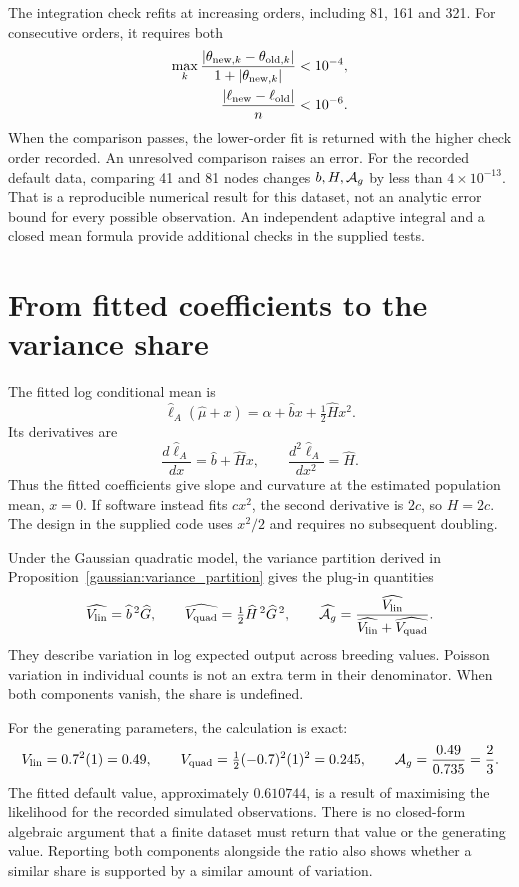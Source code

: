 The integration check refits at increasing orders, including 81, 161 and
321. For consecutive orders, it requires both
\begin{align}
 \max_k\frac{|\theta_{{\rm new},k}-\theta_{{\rm old},k}|}
                   {1+|\theta_{{\rm new},k}|}&<10^{-4},\nonumber\\
 \frac{|\ell_{\rm new}-\ell_{\rm old}|}{n}&<10^{-6}.
 \label{estimation:integration_check}
\end{align}
When the comparison passes, the lower-order fit is returned with the
higher check order recorded. An unresolved comparison raises an error.
For the recorded default data, comparing 41 and 81 nodes changes \(b,H,\mathcal A_g\)
by less than \(4\times10^{-13}\). That is a reproducible numerical result for
this dataset, not an analytic error bound for every possible observation.
An independent adaptive integral and a closed mean formula provide additional
checks in the supplied tests.

\section{From fitted coefficients to the variance share}
\label{estimation:components}

The fitted log conditional mean is
\[
 \widehat\ell_A(\widehat\mu+x)
 =\widehat\alpha+\widehat b x+\tfrac12\widehat Hx^2.
\]
Its derivatives are
\[
 \frac{d\widehat\ell_A}{dx}=\widehat b+\widehat Hx,\qquad
 \frac{d^2\widehat\ell_A}{dx^2}=\widehat H.
\]
Thus the fitted coefficients give slope and curvature at the estimated
population mean, \(x=0\). If software instead fits \(cx^2\), the second
derivative is \(2c\), so \(H=2c\). The design in the supplied code uses
\(x^2/2\) and requires no subsequent doubling.

Under the Gaussian quadratic model, the variance partition derived in
Proposition~\ref{gaussian:variance_partition} gives the plug-in quantities
\begin{equation}
 \widehat{V_{\mathrm{lin}}}=\widehat b^{\,2}\widehat G,\qquad
 \widehat{V_{\mathrm{quad}}}=\tfrac12\widehat H^{\,2}\widehat G^{\,2},\qquad
 \widehat{\mathcal A_g}=\frac{\widehat{V_{\mathrm{lin}}}}
                  {\widehat{V_{\mathrm{lin}}}+\widehat{V_{\mathrm{quad}}}}.
 \label{estimation:component_estimates}
\end{equation}
They describe variation in log expected output across breeding values.
Poisson variation in individual counts is not an extra term in their
denominator. When both components vanish, the share is undefined.

For the generating parameters, the calculation is exact:
\[
 V_{\mathrm{lin}}=0.7^2(1)=0.49,\qquad
 V_{\mathrm{quad}}=\tfrac12(-0.7)^2(1)^2=0.245,\qquad
 \mathcal A_g=\frac{0.49}{0.735}=\frac23.
\]
The fitted default value, approximately \(0.610744\), is a result of maximising
the likelihood for the recorded simulated observations. There is no
closed-form algebraic argument that a finite dataset must return that value
or the generating value. Reporting both components alongside the ratio also
shows whether a similar share is supported by a similar amount of variation.

